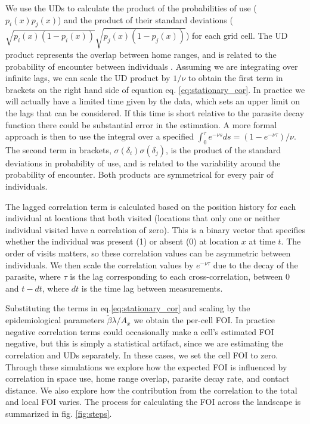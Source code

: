 \documentclass[letterpaper]{article}
\begin{document}
We use the UDs to calculate the product of the probabilities of use ($p_i(x)p_j(x)$) and the product of their standard deviations ($\sqrt{p_i(x)(1-p_i(x))}\sqrt{p_j(x)(1-p_j(x))}$) for each grid cell. 
The UD product represents the overlap between home ranges, and is related to the probability of encounter between individuals \citep{Noonan2021}. Assuming we are integrating over infinite lags, we can scale the UD product by $1/\nu$ to obtain the first term in brackets on the right hand side of equation eq. \ref{eq:stationary_cor}. In practice we will actually have a limited time given by the data, which sets an upper limit on the lags that can be considered. If this time is short relative to the parasite decay function there could be substantial error in the estimation. A more formal approach is then to use the integral over a specified  $\int_0^{\tau} e^{-\nu s}ds=(1-e^{-\nu\tau})/\nu$. %
The second term in brackets, $\sigma(\delta_i)\sigma(\delta_j)$, is the product of the standard deviations in probability of use, and is related to the variability around the probability of encounter. 
Both products are symmetrical for every pair of individuals. 

The lagged correlation term is calculated based on the position history for each individual at locations that both visited (locations that only one or neither individual visited have a correlation of zero). This is a binary vector that specifies whether the individual was present (1) or absent (0) at location $x$ at time $t$. 
The order of visits matters, so these correlation values can be asymmetric between individuals. 
We then scale the correlation values by $e^{-\nu\tau}$ due to the decay of the parasite, where $\tau$ is the lag corresponding to each cross-correlation, between 0 and $t-dt$, where $dt$ is the time lag between measurements. 

Substituting the terms in eq.\ref{eq:stationary_cor} and scaling by the epidemiological parameters $\tilde\beta\lambda/ A_x$ we obtain the per-cell FOI. 
In practice negative correlation terms could occasionally make a cell's estimated FOI negative, but this is simply a statistical artifact, since we are estimating the correlation and UDs separately. In these cases, we set the cell FOI to zero.
Through these simulations we explore how the expected FOI is influenced by correlation in space use, home range overlap, parasite decay rate, and contact distance. We also explore how the contribution from the correlation to the total and local FOI varies. The process for calculating the FOI across the landscape is summarized in fig. \ref{fig:steps}.
\end{document}
